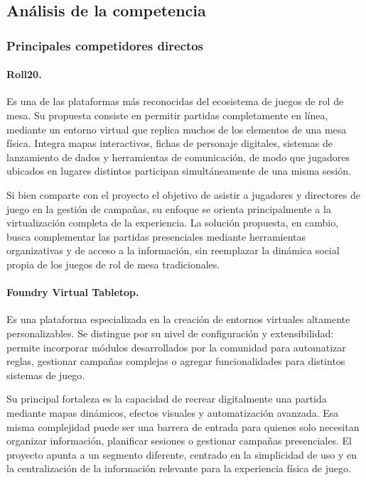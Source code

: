 \subsection{Análisis de la competencia}

\subsubsection{Principales competidores directos}\label{sec:competidores}
\paragraph{Roll20.}
Es una de las plataformas más reconocidas del ecosistema de juegos de rol de mesa. Su propuesta consiste en permitir partidas completamente en línea, mediante un entorno virtual que replica muchos de los elementos de una mesa física. Integra mapas interactivos, fichas de personaje digitales, sistemas de lanzamiento de dados y herramientas de comunicación, de modo que jugadores ubicados en lugares distintos participan simultáneamente de una misma sesión.

Si bien comparte con el proyecto el objetivo de asistir a jugadores y directores de juego en la gestión de campañas, su enfoque se orienta principalmente a la virtualización completa de la experiencia. La solución propuesta, en cambio, busca complementar las partidas presenciales mediante herramientas organizativas y de acceso a la información, sin reemplazar la dinámica social propia de los juegos de rol de mesa tradicionales.

\paragraph{Foundry Virtual Tabletop.}
Es una plataforma especializada en la creación de entornos virtuales altamente personalizables. Se distingue por su nivel de configuración y extensibilidad: permite incorporar módulos desarrollados por la comunidad para automatizar reglas, gestionar campañas complejas o agregar funcionalidades para distintos sistemas de juego.

Su principal fortaleza es la capacidad de recrear digitalmente una partida mediante mapas dinámicos, efectos visuales y automatización avanzada. Esa misma complejidad puede ser una barrera de entrada para quienes solo necesitan organizar información, planificar sesiones o gestionar campañas presenciales. El proyecto apunta a un segmento diferente, centrado en la simplicidad de uso y en la centralización de la información relevante para la experiencia física de juego.

